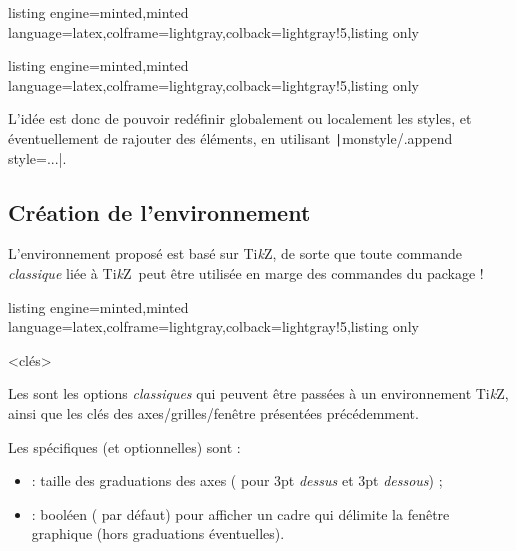 \documentclass[11pt,a4paper]{ltxdoc}
\providecommand\tikzlogo{Ti\textit{k}Z}
\let\TikZ\tikzlogo
\begin{document}
\begin{tcblisting}{listing engine=minted,minted language=latex,colframe=lightgray,colback=lightgray!5,listing only}
\end{tcblisting}

\begin{tcblisting}{listing engine=minted,minted language=latex,colframe=lightgray,colback=lightgray!5,listing only}
\end{tcblisting}

L'idée est donc de pouvoir redéfinir globalement ou localement les styles, et éventuellement de rajouter des éléments, en utilisant \texttt|monstyle/.append style={...}|.

\subsection{Création de l'environnement}\label{creaenvt}

L'environnement proposé est basé sur \TikZ, de sorte que toute commande \textit{classique} liée à \TikZ\ peut être utilisée en marge des commandes du package !

\begin{tcblisting}{listing engine=minted,minted language=latex,colframe=lightgray,colback=lightgray!5,listing only}
\begin{GraphiqueTikz}<clés>
\end{GraphiqueTikz}
\end{tcblisting}

Les  sont les options \textit{classiques} qui peuvent être passées à un environnement \TikZ, ainsi que les clés des \textsf{axes/grilles/fenêtre} présentées précédemment.

\smallskip

Les  spécifiques (et optionnelles) sont :

\smallskip

\begin{itemize}
	\item {} : taille des graduations des axes (\MontreCode{3pt} pour 3pt \textit{dessus} et 3pt \textit{dessous}) ;
	\item {} : booléen ( par défaut) pour afficher un cadre qui délimite la fenêtre graphique (hors graduations éventuelles).
\end{itemize}
\end{document}
